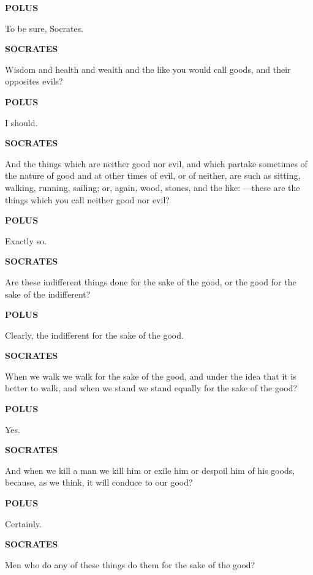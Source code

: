 \documentclass[11pt,letter]{article}
\begin{document}
\par \textbf{POLUS}
\par   To be sure, Socrates.

\par \textbf{SOCRATES}
\par   Wisdom and health and wealth and the like you would call goods, and their opposites evils?

\par \textbf{POLUS}
\par   I should.

\par \textbf{SOCRATES}
\par   And the things which are neither good nor evil, and which partake sometimes of the nature of good and at other times of evil, or of neither, are such as sitting, walking, running, sailing; or, again, wood, stones, and the like: —these are the things which you call neither good nor evil?

\par \textbf{POLUS}
\par   Exactly so.

\par \textbf{SOCRATES}
\par   Are these indifferent things done for the sake of the good, or the good for the sake of the indifferent?

\par \textbf{POLUS}
\par   Clearly, the indifferent for the sake of the good.

\par \textbf{SOCRATES}
\par   When we walk we walk for the sake of the good, and under the idea that it is better to walk, and when we stand we stand equally for the sake of the good?

\par \textbf{POLUS}
\par   Yes.

\par \textbf{SOCRATES}
\par   And when we kill a man we kill him or exile him or despoil him of his goods, because, as we think, it will conduce to our good?

\par \textbf{POLUS}
\par   Certainly.

\par \textbf{SOCRATES}
\par   Men who do any of these things do them for the sake of the good?
\end{document}
